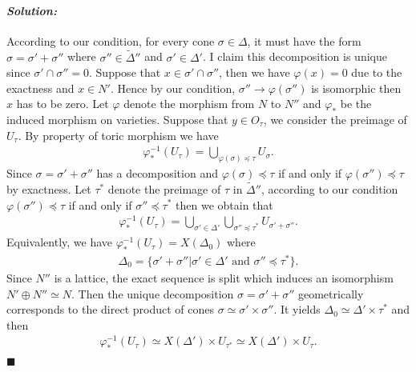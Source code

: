\documentclass[12pt, a4paper]{article}
\newenvironment{solution}
  {\paragraph{\textit{Solution:}}\par\medskip}
  {\hfill$\blacksquare$\vspace{0.1cm}}
\begin{document}
\begin{solution}
    According to our condition, for every cone $\sigma\in \Delta$, it must have the form $\sigma=\sigma'+\sigma''$ where $\sigma''\in \widetilde{\Delta}''$ and $\sigma'\in \Delta'$.
    I claim this decomposition is unique since $\sigma'\cap\sigma''=0$. Suppose that $x\in \sigma'\cap\sigma''$, then we have $\varphi(x)=0$ due to the exactness and $x\in N'$.
    Hence by our condition, $\sigma''\to \varphi(\sigma'')$ is isomorphic then $x$ has to be zero.
    Let $\varphi$ denote the morphism from $N$ to $N''$ and $\varphi_*$ be the induced morphism on varieties.
    Suppose that $y\in O_\tau$, we consider the preimage of $U_\tau$.
    By property of toric morphism we have 
    \begin{align*}
        \varphi_*^{-1}(U_\tau) = \bigcup_{\varphi(\sigma)\preceq \tau} U_{\sigma}.
    \end{align*}
    Since $\sigma = \sigma'+\sigma''$ has a decomposition and $\varphi(\sigma)\preceq \tau$ if and only if $\varphi(\sigma'')\preceq \tau$ by exactness.
    Let $\tau^*$ denote the preimage of $\tau$ in $\widetilde{\Delta}''$, according to our condition $\varphi(\sigma'')\preceq \tau$ if and only if $\sigma''\preceq \tau^*$ then we obtain that 
    \begin{align*}
        \varphi_*^{-1}(U_\tau)= \bigcup_{\sigma'\in\Delta'}\bigcup_{\sigma''\preceq \tau^*} U_{\sigma'+\sigma''}.
    \end{align*}
    Equivalently, we have $\varphi_*^{-1}(U_\tau)=X(\Delta_0)$ where 
    \begin{align*}
        \Delta_0=\{\sigma'+\sigma''|\sigma'\in \Delta'\text{ and }\sigma''\preceq \tau^*\}.
    \end{align*}
    Since $N''$ is a lattice, the exact sequence is split which induces an isomorphism $N'\oplus N''\simeq N$.
    Then the unique decomposition $\sigma = \sigma' + \sigma''$ geometrically corresponds to the direct product of cones $\sigma \simeq \sigma' \times \sigma''$.
    It yields $\Delta_0\simeq \Delta'\times \tau^*$ and then 
    \begin{align*}
        \varphi_*^{-1}(U_\tau) \simeq X(\Delta')\times U_{\tau^*}\simeq X(\Delta')\times U_\tau.
    \end{align*}
\end{solution}
\end{document}
